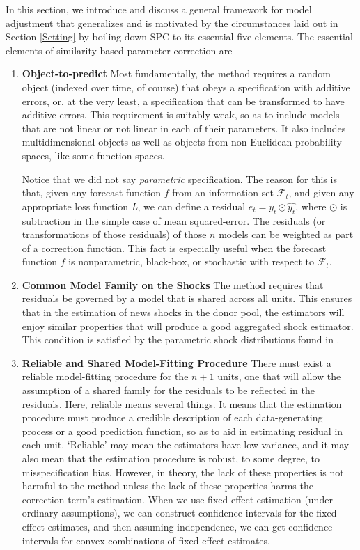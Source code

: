 \documentclass[11pt]{article}
\theoremstyle{definition}
\begin{document}
In this section, we introduce and discuss a general framework for model adjustment that generalizes and is motivated by the circumstances laid out in Section \ref{Setting} by boiling down SPC to its essential five elements.  The essential elements of similarity-based parameter correction are

\begin{enumerate}
  \item \textbf{Object-to-predict}
  Most fundamentally, the method requires a random object (indexed over time, of course) that obeys a specification with additive errors, or, at the very least, a specification that can be transformed to have additive errors.  This requirement is suitably weak, so as to include models that are not linear or not linear in each of their parameters.  It also includes multidimensional objects as well as objects from non-Euclidean probability spaces, like some function spaces.  

Notice that we did not say \textit{parametric} specification.  The reason for this is that, given any forecast function $f$ from an information set $\mathcal{F}_{t}$, and given any appropriate loss function \textit{L}, we can define a residual $e_{t} = y_{t} \odot \hat{y_{t}}$, where $\odot$ is subtraction in the simple case of mean squared-error.  The residuals (or transformations of those residuals) of those $n$ models can be weighted as part of a correction function.  This fact is especially useful when the forecast function $f$ is nonparametric, black-box, or stochastic with respect to $\mathcal{F}_{t}$.

\item \textbf{Common Model Family on the Shocks} The method requires that residuals be governed by a model that is shared across all units.  This ensures that in the estimation of news shocks in the donor pool, the estimators will enjoy similar properties that will produce a good aggregated shock estimator.  This condition is satisfied by the parametric shock distributions found in \cite{lin2021minimizing,lundquist2024volatility}.

\item \textbf{Reliable and Shared Model-Fitting Procedure} There must exist a reliable model-fitting procedure for the $n+1$ units, one that will allow the assumption of a shared family for the residuals to be reflected in the residuals.  Here, reliable means several things.  It means that the estimation procedure must produce a credible description of each data-generating process or a good prediction function, so as to aid in estimating residual in each unit.  `Reliable' may mean the estimators have low variance, and it may also mean that the estimation procedure is robust, to some degree, to misspecification bias.  However, in theory, the lack of these properties is not harmful to the method unless the lack of these properties harms the correction term's estimation.  When we use fixed effect estimation (under ordinary assumptions), we can construct confidence intervals for the fixed effect estimates, and then assuming independence, we can get confidence intervals for convex combinations of fixed effect estimates.


\end{enumerate}
\end{document}
